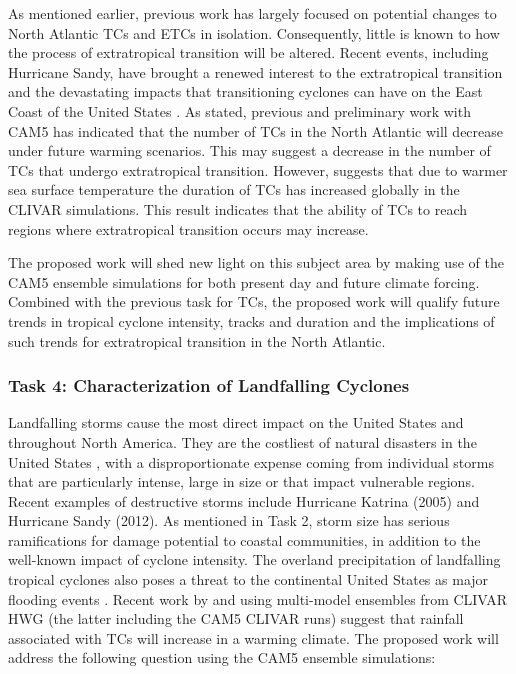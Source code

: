 \documentclass[11pt]{article}
\begin{document}
As mentioned earlier, previous work has largely focused on potential changes to North Atlantic TCs and ETCs in isolation.  Consequently, little is known to how the process of extratropical transition will be altered. Recent events, including Hurricane Sandy, have brought a renewed interest to the extratropical transition and the devastating impacts that transitioning cyclones can have on the East Coast of the United States \citep{Blake2013}. As stated, previous and preliminary work with CAM5 has indicated that the number of TCs in the North Atlantic will decrease under future warming scenarios. This may suggest a decrease in the number of TCs that undergo extratropical transition.  However, \citet{Wehner2015} suggests that due to warmer sea surface temperature the duration of TCs has increased globally in the  CLIVAR simulations.  This result indicates that the ability of TCs to reach regions where extratropical transition occurs may increase.

The proposed work will shed new light on this subject area by making use of the CAM5 ensemble simulations for both present day and future climate forcing. Combined with the previous task for TCs, the proposed work will qualify future trends in tropical cyclone intensity, tracks and duration and the implications of such trends for extratropical transition in the North Atlantic.

\subsubsection{Task 4: Characterization of Landfalling Cyclones}

Landfalling storms cause the most direct impact on the United States and throughout North America.  They are the costliest of natural disasters in the United States \citep{Pielke1998}, with a disproportionate expense coming from individual storms that are particularly intense, large in size or that impact vulnerable regions. Recent examples of destructive storms include Hurricane Katrina (2005) and Hurricane Sandy (2012). As mentioned in Task 2, storm size has serious ramifications for damage potential to coastal communities, in addition to the well-known impact of cyclone intensity.  The overland precipitation of landfalling tropical cyclones also poses a threat to the continental United States as major flooding events \citep{Villarini2014tcflooding}. Recent work by \citet{Scoccimarro2014} and \cite{Villarini2014} using multi-model ensembles from CLIVAR HWG (the latter including the CAM5 CLIVAR runs) suggest that rainfall associated with TCs will increase in a warming climate. The proposed work will address the following question using the CAM5 ensemble simulations:
\end{document}
